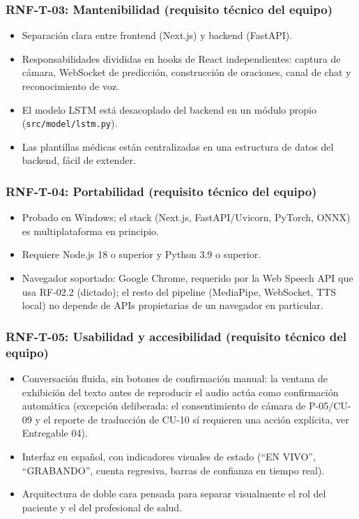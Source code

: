 \subsubsection{RNF-T-03: Mantenibilidad (requisito técnico del equipo)}
\begin{itemize}
    \item Separación clara entre frontend (Next.js) y backend (FastAPI).
    \item Responsabilidades divididas en hooks de React independientes: captura de cámara, WebSocket de predicción, construcción de oraciones, canal de chat y reconocimiento de voz.
    \item El modelo LSTM está desacoplado del backend en un módulo propio (\texttt{src/\allowbreak model/\allowbreak lstm.py}).
    \item Las plantillas médicas están centralizadas en una estructura de datos del backend, fácil de extender.
\end{itemize}

\subsubsection{RNF-T-04: Portabilidad (requisito técnico del equipo)}
\begin{itemize}
    \item Probado en Windows; el stack (Next.js, FastAPI/Uvicorn, PyTorch, ONNX) es multiplataforma en principio.
    \item Requiere Node.js 18 o superior y Python 3.9 o superior.
    \item Navegador soportado: Google Chrome, requerido por la Web Speech API que usa RF-02.2 (dictado); el resto del pipeline (MediaPipe, WebSocket, TTS local) no depende de APIs propietarias de un navegador en particular.
\end{itemize}

\subsubsection{RNF-T-05: Usabilidad y accesibilidad (requisito técnico del equipo)}
\begin{itemize}
    \item Conversación fluida, sin botones de confirmación manual: la ventana de exhibición del texto antes de reproducir el audio actúa como confirmación automática (excepción deliberada: el consentimiento de cámara de P-05/CU-09 y el reporte de traducción de CU-10 sí requieren una acción explícita, ver Entregable 04).
    \item Interfaz en español, con indicadores visuales de estado (``EN VIVO'', ``GRABANDO'', cuenta regresiva, barras de confianza en tiempo real).
    \item Arquitectura de doble cara pensada para separar visualmente el rol del paciente y el del profesional de salud.
\end{itemize}

